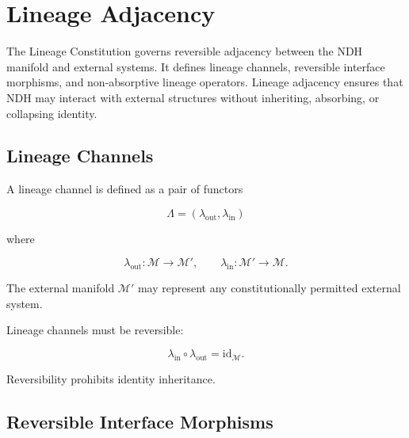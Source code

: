 
\section{Lineage Adjacency}
\label{sec:lineage-adjacency}

The Lineage Constitution governs reversible adjacency between the NDH
manifold and external systems. It defines lineage channels, reversible
interface morphisms, and non-absorptive lineage operators. Lineage adjacency
ensures that NDH may interact with external structures without inheriting,
absorbing, or collapsing identity.


\subsection{Lineage Channels}

A lineage channel is defined as a pair of functors

\[
\Lambda = (\lambda_{\mathrm{out}}, \lambda_{\mathrm{in}})
\]

where

\[
\lambda_{\mathrm{out}} : \mathcal{M} \to \mathcal{M}', \qquad
\lambda_{\mathrm{in}}  : \mathcal{M}' \to \mathcal{M}.
\]

The external manifold $\mathcal{M}'$ may represent any constitutionally
permitted external system.

Lineage channels must be reversible:

\[
\lambda_{\mathrm{in}} \circ \lambda_{\mathrm{out}} = \mathrm{id}_{\mathcal{M}}.
\]

Reversibility prohibits identity inheritance.


\subsection{Reversible Interface Morphisms}


